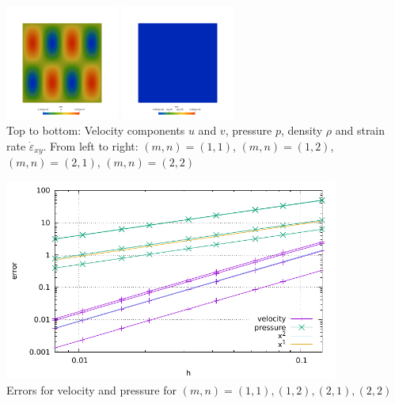 \begin{center}
\includegraphics[width=3.74cm]{python_codes/fieldstone_32/results/exy_2x1}
\includegraphics[width=3.74cm]{python_codes/fieldstone_32/results/exy_2x2}\\
{\small Top to bottom: Velocity components $u$ and $v$, pressure $p$, density $\rho$ and 
strain rate $\dot \varepsilon_{xy}$. 
From left to right: $(m,n)=(1,1)$, $(m,n)=(1,2)$, $(m,n)=(2,1)$, $(m,n)=(2,2)$ }
\end{center}

\newpage
\begin{center}
\includegraphics[width=11cm]{python_codes/fieldstone_32/results/errors}\\
{\small Errors for velocity and pressure for $(m,n)=(1,1),(1,2),(2,1),(2,2)$ }
\end{center}



